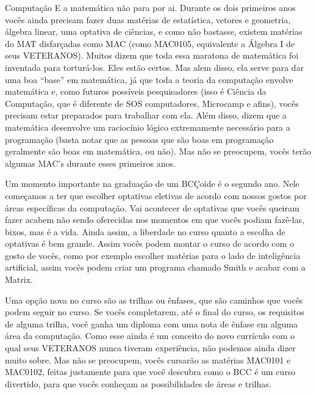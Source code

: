 \begin{subsecao}{Computação}
E a matemática não para por ai. Durante os dois primeiros anos vocês ainda
precisam fazer duas matérias de estatística, vetores e geometria, álgebra linear, uma
optativa de ciências, e como não bastasse, existem matérias do MAT disfarçadas
como MAC (como MAC0105, equivalente a Álgebra I de seus VETERANOS). Muitos dizem
que toda essa maratona de matemática foi inventada para torturá-los. Eles estão
certos. Mas alem disso, ela serve para dar uma boa ``base'' em matemática, já
que toda a teoria da computação envolve matemática e, como futuros possíveis
pesquisadores (isso é Ciência da Computação, que é diferente de SOS
computadores, Microcamp e afins), vocês precisam estar preparados para trabalhar
com ela. Além disso, dizem que a matemática desenvolve um raciocínio lógico
extremamente necessário para a programação (basta notar que as pessoas que são
boas em programação geralmente são boas em matemática, ou não). Mas não se
preocupem, vocês terão algumas MAC's durante esses primeiros anos.

Um momento importante na graduação de um BCÇoide é o segundo ano. Nele começamos
a ter que escolher optativas eletivas de acordo com nossos gostos por áreas
específicas da computação. Vai acontecer de optativas que vocês queiram fazer
acabem não sendo oferecidas nos momentos em que vocês podiam fazê-las, bixos,
mas é a vida. Ainda assim, a liberdade no curso quanto a escolha de optativas é
bem grande. Assim vocês podem montar o curso de acordo com o gosto de vocês,
como por exemplo escolher matérias para o lado de inteligência artificial, assim
vocês podem criar um programa chamado Smith e acabar com a Matrix.

Uma opção nova no curso são as trilhas ou ênfases, que são caminhos que vocês
podem seguir no curso. Se vocês completarem, até o final do curso, os requisitos
de alguma trilha, você ganha um diploma com uma nota de ênfase em alguma área da
computação. Como esse ainda é um conceito do novo currículo com o qual seus
VETERANOS nunca tiveram experiência, não podemos ainda dizer muito sobre. Mas
não se preocupem, vocês cursarão as matérias MAC0101 e MAC0102, feitas
justamente para que você descubra como o BCC é um curso divertido, para que
vocês conheçam as possibilidades de áreas e trilhas.


\end{subsecao}
